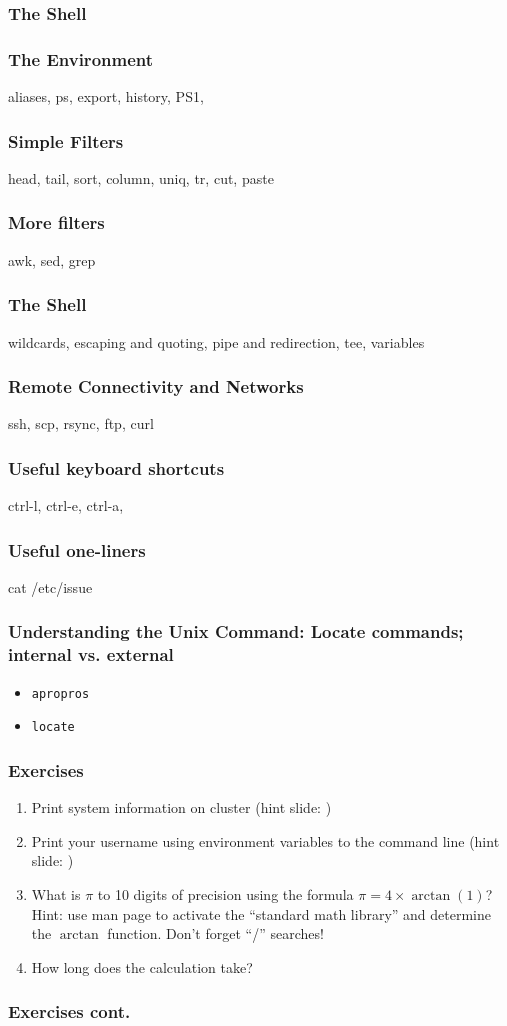\documentclass[hyperref={pdfpagelabels=false},12pt]{beamer}
\begin{document}
\begin{frame}
\frametitle{The Shell}
\end{frame}

\begin{frame}
\frametitle{The Environment}
\centering
aliases, ps, export, history, PS1, 
\end{frame}

\begin{frame}
\frametitle{Simple Filters}
\centering
head, tail, sort, column, uniq, tr, cut, paste 
\end{frame}

\begin{frame}
\frametitle{More filters}
\centering
awk, sed, grep
\end{frame}

\begin{frame}
\frametitle{The Shell}
\centering
wildcards, escaping and quoting, pipe and redirection, tee, variables
\end{frame}

\begin{frame}
\frametitle{Remote Connectivity and Networks}
\centering
ssh, scp, rsync, ftp, curl
\end{frame}

\begin{frame}
\frametitle{Useful keyboard shortcuts}
\centering
ctrl-l, ctrl-e, ctrl-a, 
\end{frame}

\begin{frame}
\frametitle{Useful one-liners}
\centering
cat /etc/issue
\end{frame}

\begin{frame}
\frametitle{Understanding the Unix Command: Locate commands; internal vs. external}
\centering
\begin{itemize}
    \item \texttt{apropros}
    \item \texttt{locate}
\end{itemize}
\end{frame}

\begin{frame}
\frametitle{Exercises}
\begin{enumerate}
    \item Print system information on cluster (hint slide: )
    \item Print your username using environment variables to the command line
    (hint slide: )
    \item What is $\pi$ to 10 digits of precision using the formula
    $\pi=4\times\arctan(1)$? Hint: use man page to activate the ``standard math
    library'' and determine the $\arctan$ function. Don't forget ``/'' searches!
    \item How long does the calculation take?
\end{enumerate}
\end{frame}

\begin{frame}
\frametitle{Exercises cont.}

\end{frame}
\end{document}
